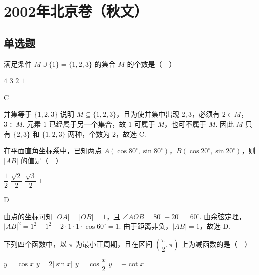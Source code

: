 \chapter{2002年北京卷（秋文）}
\section{单选题}
\begin{problem}
满足条件 \(M\cup\{1\}=\{1,2,3\}\) 的集合 \(M\) 的个数是（\(\quad\)）

\choices
    {\(4\)}
    {\(3\)}
    {\(2\)}
    {\(1\)}
\end{problem}

\begin{answer}
C
\end{answer}

\begin{solution}
并集等于 \(\{1,2,3\}\) 说明 \(M\subseteq\{1,2,3\}\)，且为使并集中出现 \(2,3\)，必须有 \(2\in M\)，\(3\in M\). 元素 \(1\) 已经属于另一个集合，故 \(1\) 可属于 \(M\)，也可不属于 \(M\). 因此 \(M\) 只有 \(\{2,3\}\) 和 \(\{1,2,3\}\) 两种，个数为 \(2\)，故选 C.
\end{solution}

\begin{problem}
在平面直角坐标系中，已知两点 \(A(\cos80^\circ,\sin80^\circ)\)，\(B(\cos20^\circ,\sin20^\circ)\)，则 \(|AB|\) 的值是（\(\quad\)）

\choices
    {\(\dfrac{1}{2}\)}
    {\(\dfrac{\sqrt{2}}{2}\)}
    {\(\dfrac{\sqrt{3}}{2}\)}
    {\(1\)}
\end{problem}

\begin{answer}
D
\end{answer}

\begin{solution}
由点的坐标可知 \(\lvert OA\rvert=\lvert OB\rvert=1\)，且 \(\angle AOB=80^\circ-20^\circ=60^\circ\). 由余弦定理，\(\lvert AB\rvert^2=1^2+1^2-2\cdot1\cdot1\cdot\cos60^\circ=1\). 由于距离非负，\(\lvert AB\rvert=1\)，故选 D.
\end{solution}

\begin{problem}
下列四个函数中，以 \(\pi\) 为最小正周期，且在区间 \(\left(\dfrac{\pi}{2},\pi\right)\) 上为减函数的是（\(\quad\)）

\choices
    {\(y=\cos x\)}
    {\(y=2\lvert\sin x\rvert\)}
    {\(y=\cos \dfrac{x}{2}\)}
    {\(y=-\cot x\)}
\end{problem}

